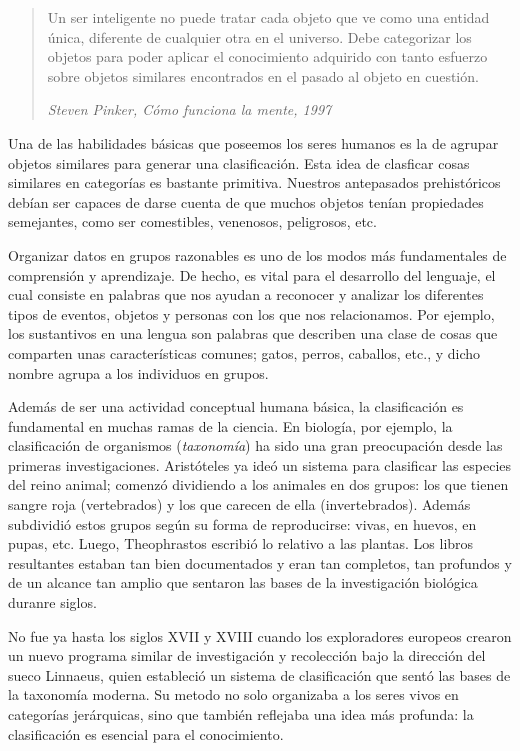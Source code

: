 \begin{quote}
    Un ser inteligente no puede tratar cada objeto que ve como una entidad única, diferente de cualquier otra en el universo. Debe categorizar los 
    objetos para poder aplicar el conocimiento adquirido con tanto esfuerzo sobre objetos similares encontrados en el pasado al objeto en cuestión.

\textit{Steven Pinker, Cómo funciona la mente, 1997}
\end{quote}

Una de las habilidades básicas que poseemos los seres humanos es la de agrupar objetos similares para generar una clasificación. Esta idea de 
clasficar cosas similares en categorías es bastante primitiva. Nuestros antepasados prehistóricos debían ser capaces de darse cuenta de que muchos
objetos tenían propiedades semejantes, como ser comestibles, venenosos, peligrosos, etc. \newline

Organizar datos en grupos razonables es uno de los modos más fundamentales de comprensión y aprendizaje. De hecho, es vital para el desarrollo del 
lenguaje, el cual consiste en palabras que nos ayudan a reconocer y analizar los diferentes tipos de eventos, objetos y personas con los que nos
relacionamos. Por ejemplo, los sustantivos en una lengua son palabras que describen una clase de cosas que comparten unas características comunes; 
gatos, perros, caballos, etc., y dicho nombre agrupa a los individuos en grupos. \newline

Además de ser una actividad conceptual humana básica, la clasificación es fundamental en muchas ramas de la ciencia. En biología, por ejemplo, la 
clasificación de organismos (\textit{taxonomía}) ha sido una gran preocupación desde las primeras investigaciones. Aristóteles ya ideó un sistema para clasificar las especies
del reino animal; comenzó dividiendo a los animales en dos grupos: los que tienen sangre roja (vertebrados) y los que carecen de ella (invertebrados). 
Además subdividió estos grupos según su forma de reproducirse: vivas, en huevos, en pupas, etc. Luego, Theophrastos escribió lo relativo a las plantas.
Los libros resultantes estaban tan bien documentados y eran tan completos, tan profundos y de un alcance tan amplio que sentaron las bases de la investigación
biológica duranre siglos. \newline

No fue ya hasta los siglos XVII y XVIII cuando los exploradores europeos crearon un nuevo programa similar de investigación y recolección bajo la dirección del 
sueco Linnaeus, quien estableció un sistema de clasificación que sentó las bases de la taxonomía moderna. Su metodo no solo organizaba a los seres vivos
en categorías jerárquicas, sino que también reflejaba una idea más profunda: la clasificación es esencial para el conocimiento. \newline

